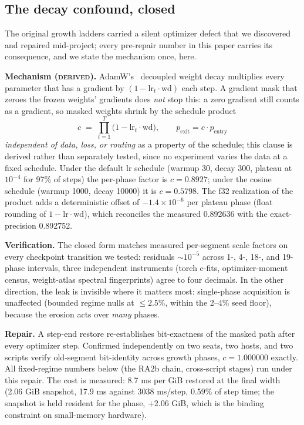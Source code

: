 \documentclass[11pt]{article}
\theoremstyle{definition}\newtheorem{definition}{Definition}
\theoremstyle{remark}\newtheorem{remark}{Remark}
\begin{document}
\subsection{The decay confound, closed}\label{sec:decay}

The original growth ladders carried a silent optimizer defect that we discovered and
repaired mid-project; every pre-repair number in this paper carries its consequence, and we
state the mechanism once, here.

\textbf{Mechanism (\textsc{derived}).} AdamW's~\cite{adamw} decoupled weight decay multiplies every
parameter that has a gradient by $(1-\mathrm{lr}_t\cdot\mathrm{wd})$ each step. A gradient
mask that zeroes the frozen weights' gradients does \emph{not} stop this: a zero gradient
still counts as a gradient, so masked weights shrink by the schedule product
\[
c \;=\; \prod_{t=1}^{T}\bigl(1-\mathrm{lr}_t\cdot\mathrm{wd}\bigr),
\qquad
p_{\text{exit}} = c\cdot p_{\text{entry}}
\]
\emph{independent of data, loss, or routing} as a property of the schedule; this clause is derived rather than separately tested, since no experiment varies the data at a fixed schedule. Under the default lr schedule
(warmup 30, decay 300, plateau at $10^{-4}$ for 97\% of steps) the per-phase factor is
$c=0.8927$; under the cosine schedule (warmup 1000, decay 10000) it is $c=0.5798$. The f32
realization of the product adds a deterministic offset of $-1.4\times10^{-6}$ per plateau
phase (float rounding of $1-\mathrm{lr}\cdot\mathrm{wd}$), which reconciles the measured
0.892636 with the exact-precision 0.892752.

\textbf{Verification.} The closed form matches measured per-segment scale factors on
every checkpoint transition we tested: residuals $\sim\!10^{-5}$ across 1-, 4-, 18-, and
19-phase intervals, three independent instruments (torch c-fits, optimizer-moment census,
weight-atlas spectral fingerprints) agree to four decimals. In the other direction, the leak
is invisible where it matters most: single-phase acquisition is unaffected (bounded regime
nulls at $\le 2.5\%$, within the 2--4\% seed floor), because the erosion acts over
\emph{many} phases.

\textbf{Repair.} A step-end restore re-establishes bit-exactness of the masked path after
every optimizer step. Confirmed independently on two seats, two hosts, and two scripts
verify old-segment bit-identity across growth phases, $c=1.000000$ exactly. All fixed-regime
numbers below (the RA2b chain, cross-script stages) run under this repair. The cost is measured: 8.7 ms per GiB restored at the final width (2.06 GiB snapshot, 17.9 ms against 3038 ms/step, 0.59\% of step time; the snapshot is held resident for the phase, +2.06 GiB, which is the binding constraint on small-memory hardware).
\end{document}
